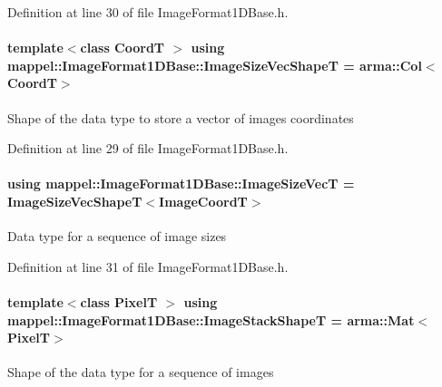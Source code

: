 Definition at line 30 of file Image\+Format1\+D\+Base.\+h.

\paragraph[{\texorpdfstring{Image\+Size\+Vec\+ShapeT}{ImageSizeVecShapeT}}]{\setlength{\rightskip}{0pt plus 5cm}template$<$class CoordT $>$ using {\bf mappel\+::\+Image\+Format1\+D\+Base\+::\+Image\+Size\+Vec\+ShapeT} =  arma\+::\+Col$<$CoordT$>$\hspace{0.3cm}{\ttfamily [inherited]}}\hypertarget{classmappel_1_1ImageFormat1DBase_a3c584ee68fa44dc10de2edbc3d9882bb}{}\label{classmappel_1_1ImageFormat1DBase_a3c584ee68fa44dc10de2edbc3d9882bb}
Shape of the data type to store a vector of image\textquotesingle{}s coordinates 

Definition at line 29 of file Image\+Format1\+D\+Base.\+h.

\paragraph[{\texorpdfstring{Image\+Size\+VecT}{ImageSizeVecT}}]{\setlength{\rightskip}{0pt plus 5cm}using {\bf mappel\+::\+Image\+Format1\+D\+Base\+::\+Image\+Size\+VecT} =  {\bf Image\+Size\+Vec\+ShapeT}$<${\bf Image\+CoordT}$>$\hspace{0.3cm}{\ttfamily [inherited]}}\hypertarget{classmappel_1_1ImageFormat1DBase_a5114a360a9bfcc4b5bc498c4600452f7}{}\label{classmappel_1_1ImageFormat1DBase_a5114a360a9bfcc4b5bc498c4600452f7}
Data type for a sequence of image sizes 

Definition at line 31 of file Image\+Format1\+D\+Base.\+h.

\paragraph[{\texorpdfstring{Image\+Stack\+ShapeT}{ImageStackShapeT}}]{\setlength{\rightskip}{0pt plus 5cm}template$<$class PixelT $>$ using {\bf mappel\+::\+Image\+Format1\+D\+Base\+::\+Image\+Stack\+ShapeT} =  arma\+::\+Mat$<$PixelT$>$\hspace{0.3cm}{\ttfamily [inherited]}}\hypertarget{classmappel_1_1ImageFormat1DBase_ad9d4f0c3d04f3cecf3bf6b4709dcb4a8}{}\label{classmappel_1_1ImageFormat1DBase_ad9d4f0c3d04f3cecf3bf6b4709dcb4a8}
Shape of the data type for a sequence of images 

